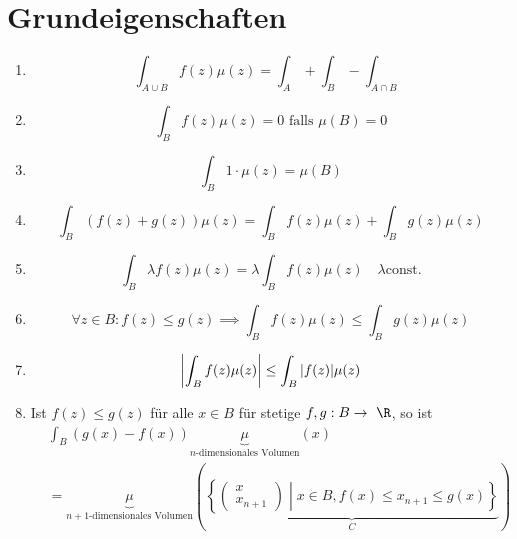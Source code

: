 \section{Grundeigenschaften}
\begin{enumerate}[label=(\alph*)]
	\item \[ \int_{A \cup B} f(z) \mu(z) = \int_A + \int_B - \int_{A \cap B} \]
	\item \[ \int_B f(z) \mu(z) = 0 \text{ falls } \mu(B) = 0 \]
	\item \[ \int_B 1 \cdot \mu(z) = \mu(B) \]
	\item \[ \int_B ( f(z) + g(z) ) \mu(z) = \int_B f(z) \mu(z) + \int_B g(z) \mu(z) \]
	\item \[ \int_B \lambda f(z) \mu(z) = \lambda \int_B f(z) \mu(z) \quad \lambda \text{const.} \]
	\item \[ \forall z \in B : f(z) \leq g(z) \implies \int_B f(z) \mu(z) \leq \int_B g(z) \mu(z) \]
	\item \[ \abs{ \int_B f(z) \mu(z) } \leq \int_B \abs{f(z)} \mu(z) \]
	\item Ist $f(z) \leq g(z)$ für alle $x \in B$ für stetige $f , g : B \rightarrow \R$, so ist
		\[ \begin{split}
			&\int_B ( g(x) - f(x) ) \underbrace{\mu}_{n\text{-dimensionales Volumen}}(x) \\
			&= \underbrace{\mu}_{n+1 \text{-dimensionales Volumen}}\left(\underbrace{\left\{ \begin{pmatrix} x \\ x_{n+1} \end{pmatrix} \middle| x \in B , f(x) \leq x_{n+1} \leq g(x) \right\}}_{C}\right)
		\end{split} \]
\end{enumerate}
